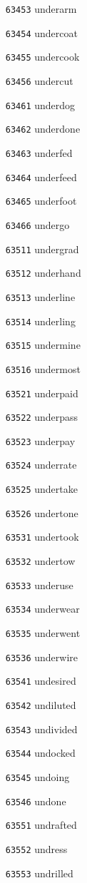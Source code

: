 \documentclass[twoside,11pt]{article}
\begin{document}
\begin{multicols}{5}
\begin{enumerate}
\item[\texttt{63453}] underarm
\item[\texttt{63454}] undercoat
\item[\texttt{63455}] undercook
\item[\texttt{63456}] undercut
\item[\texttt{63461}] underdog
\item[\texttt{63462}] underdone
\item[\texttt{63463}] underfed
\item[\texttt{63464}] underfeed
\item[\texttt{63465}] underfoot
\item[\texttt{63466}] undergo
\item[\texttt{63511}] undergrad
\item[\texttt{63512}] underhand
\item[\texttt{63513}] underline
\item[\texttt{63514}] underling
\item[\texttt{63515}] undermine
\item[\texttt{63516}] undermost
\item[\texttt{63521}] underpaid
\item[\texttt{63522}] underpass
\item[\texttt{63523}] underpay
\item[\texttt{63524}] underrate
\item[\texttt{63525}] undertake
\item[\texttt{63526}] undertone
\item[\texttt{63531}] undertook
\item[\texttt{63532}] undertow
\item[\texttt{63533}] underuse
\item[\texttt{63534}] underwear
\item[\texttt{63535}] underwent
\item[\texttt{63536}] underwire
\item[\texttt{63541}] undesired
\item[\texttt{63542}] undiluted
\item[\texttt{63543}] undivided
\item[\texttt{63544}] undocked
\item[\texttt{63545}] undoing
\item[\texttt{63546}] undone
\item[\texttt{63551}] undrafted
\item[\texttt{63552}] undress
\item[\texttt{63553}] undrilled

\end{enumerate}
\end{multicols}
\end{document}
